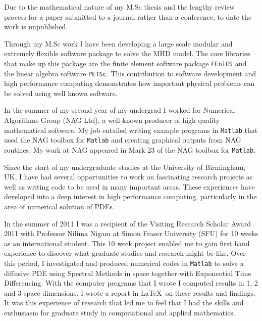 \documentclass[12pt]{article}
\numberwithin{equation}{section}    %
\begin{document}
Due to the mathematical nature of my M.Sc thesis and the lengthy review process for a paper submitted to a journal rather than a conference, to date the work is unpublished.
\smallskip


Through my M.Sc work I have been developing a large scale modular and extremely flexible software package to solve the MHD model. The core libraries that make up this package are the finite element software package {\tt FEniCS} and the linear algebra software {\tt PETSc}. This contribution to software development and high performance computing demonstrates how important physical problems can be solved using well known software.
\smallskip

In the summer of my second year of my undergrad I worked for Numerical Algorithms Group (NAG Ltd), a well-known producer of high quality mathematical software. My job entailed writing example programs in {\tt{Matlab}} that used the NAG toolbox for {\tt{Matlab}} and creating graphical outputs from NAG routines. My work at NAG appeared in Mark 23 of the NAG toolbox for {\tt{Matlab}}.



\bigskip
\medskip

Since the start of my undergraduate studies at the University of Birmingham, UK, I have had several opportunities to work on fascinating research projects as well as writing code to be used in many important areas. These experiences have developed into a deep interest in high performance computing, particularly in the area of numerical solution of PDEs.
\smallskip

In the summer of 2011 I was a recipient of the Visiting Research Scholar Award 2011 with Professor Nilima Nigam at Simon Fraser University (SFU) for 10 weeks as an international student. This 10 week project enabled me to gain first hand experience to discover what graduate studies and research might be like. Over this period, I investigated and produced numerical codes in {\tt{Matlab}} to solve a diffusive PDE using Spectral Methods in space together with Exponential Time Differencing. With the computer programs that I wrote I computed results in 1, 2 and 3 space dimensions. I wrote a report in \LaTeX \ on these results and findings. It was this experience of research that led me to feel that I had the skills and enthusiasm for graduate study in computational and applied mathematics.
\smallskip
\end{document}

